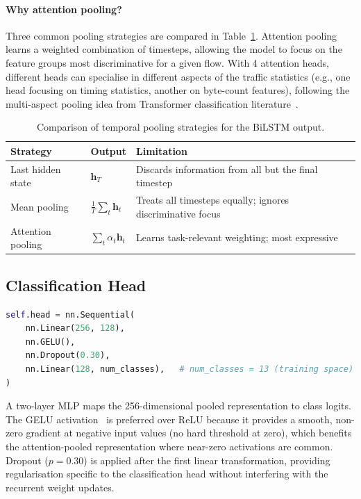 \documentclass[12pt]{article}
\theoremstyle{plain}
\begin{document}
\paragraph{Why attention pooling?} Three common pooling strategies are compared in Table~\ref{tab:pooling}. Attention pooling learns a weighted combination of timesteps, allowing the model to focus on the feature groups most discriminative for a given flow. With 4 attention heads, different heads can specialise in different aspects of the traffic statistics (e.g., one head focusing on timing statistics, another on byte-count features), following the multi-aspect pooling idea from Transformer classification literature~\cite{Vaswani2017}.

\begin{table}[H]
\centering
\caption{Comparison of temporal pooling strategies for the BiLSTM output.}
\label{tab:pooling}
\begin{tabular}{lll}
\toprule
\textbf{Strategy} & \textbf{Output} & \textbf{Limitation} \\
\midrule
Last hidden state & $\mathbf{h}_{T}$ & Discards information from all but the final timestep \\
Mean pooling & $\frac{1}{T}\sum_t \mathbf{h}_t$ & Treats all timesteps equally; ignores discriminative focus \\
Attention pooling & $\sum_t \alpha_t \mathbf{h}_t$ & Learns task-relevant weighting; most expressive \\
\bottomrule
\end{tabular}
\end{table}

\subsection{Classification Head}

\begin{lstlisting}[language=Python, caption={Classification head.}]
self.head = nn.Sequential(
    nn.Linear(256, 128),
    nn.GELU(),
    nn.Dropout(0.30),
    nn.Linear(128, num_classes),   # num_classes = 13 (training space)
)
\end{lstlisting}

A two-layer MLP maps the 256-dimensional pooled representation to class logits. The GELU activation~\cite{Hendrycks2016} is preferred over ReLU because it provides a smooth, non-zero gradient at negative input values (no hard threshold at zero), which benefits the attention-pooled representation where near-zero activations are common. Dropout ($p = 0.30$) is applied after the first linear transformation, providing regularisation specific to the classification head without interfering with the recurrent weight updates.
\end{document}
